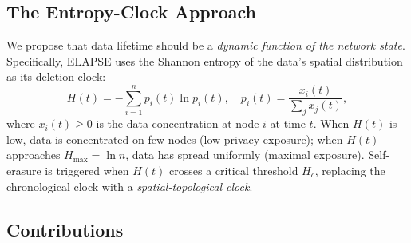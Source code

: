 \documentclass[review,12pt]{elsarticle}
\newcommand{\Hc}{H_c}
\newcommand{\Hmax}{H_{\max}}
\begin{document}
\subsection{The Entropy-Clock Approach}

We propose that data lifetime should be a \emph{dynamic function of the
network state}. Specifically, ELAPSE uses the Shannon entropy of the data's
spatial distribution as its deletion clock:
\begin{equation}
  H(t) = -\sum_{i=1}^{n} p_i(t) \ln p_i(t), \quad
  p_i(t) = \frac{x_i(t)}{\sum_j x_j(t)},
  \label{eq:entropy}
\end{equation}
where $x_i(t) \geq 0$ is the data concentration at node $i$ at time $t$.
When $H(t)$ is low, data is concentrated on few nodes (low privacy exposure);
when $H(t)$ approaches $\Hmax = \ln n$, data has spread uniformly (maximal
exposure). Self-erasure is triggered when $H(t)$ crosses a critical
threshold $\Hc$, replacing the chronological clock with a
\emph{spatial-topological clock}.

\subsection{Contributions}
\end{document}
